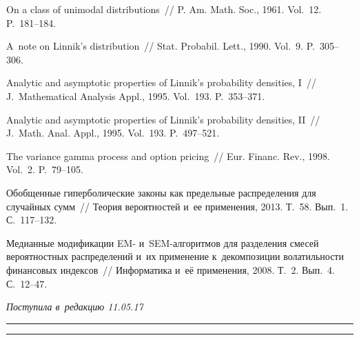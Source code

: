 \begin{multicols}{2}
{{\begin{thebibliography}{99}
 On a class of unimodal distributions~// 
P. Am. Math. Soc., 1961. Vol.~12. P.~181--184.

 A~note on Linnik's distribution~// 
Stat. Probabil. Lett., 1990. Vol.~9. P.~305--306.


 Analytic and asymptotic
properties of Linnik's probability densities, I~// 
J.~Mathematical Analysis Appl., 1995. Vol.~193. P.~353--371.

\pagebreak

Analytic and asymptotic
properties of Linnik's probability densities, II~// J.~Math. Anal. 
Appl., 1995. Vol.~193. P.~497--521.

 The variance gamma
process and option pricing~// Eur. Financ. Rev., 1998. Vol.~2.
P.~79--105.

 Обобщенные гиперболические законы как
предельные распределения для случайных сумм~// Теория вероятностей 
и~ее применения, 2013. Т.~58. Вып.~1. С.~117--132.

 Медианные
модификации EM- и~SEM-ал\-го\-рит\-мов для разделения смесей вероятностных
распределений и~их применение к~декомпозиции волатильности
финансовых индексов~// Информатика и~её применения, 2008. Т.~2. Вып.~4. С.~12--47.
 \end{thebibliography}

 }
 }

\end{multicols}

\vspace*{-3pt}

\hfill{\small\textit{Поступила в~редакцию 11.05.17}}

\vspace*{8pt}



\hrule

\vspace*{2pt}

\hrule



